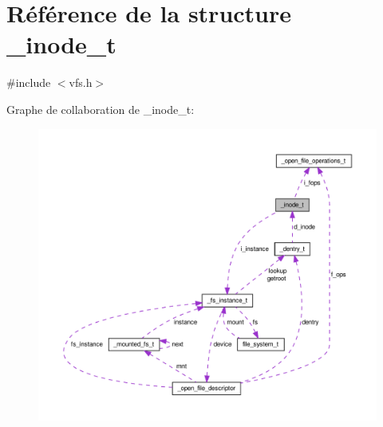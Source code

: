 \hypertarget{struct__inode__t}{\section{Référence de la structure \-\_\-inode\-\_\-t}
\label{struct__inode__t}
}


{\ttfamily \#include $<$vfs.\-h$>$}



Graphe de collaboration de \-\_\-inode\-\_\-t\-:
\nopagebreak
\begin{figure}[H]
\begin{center}
\leavevmode
\includegraphics[width=350pt]{struct__inode__t__coll__graph}
\end{center}
\end{figure}
